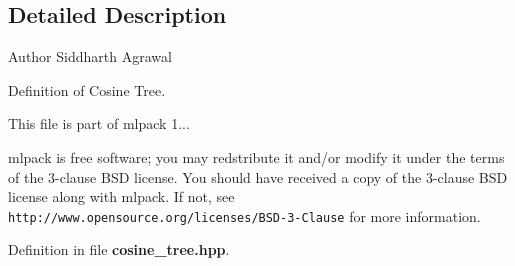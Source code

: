 \subsection{Detailed Description}
\begin{DoxyAuthor}{Author}
Siddharth Agrawal
\end{DoxyAuthor}
Definition of Cosine Tree.

This file is part of mlpack 1...

mlpack is free software; you may redstribute it and/or modify it under the terms of the 3-\/clause B\-S\-D license. You should have received a copy of the 3-\/clause B\-S\-D license along with mlpack. If not, see {\tt http\-://www.\-opensource.\-org/licenses/\-B\-S\-D-\/3-\/\-Clause} for more information. 

Definition in file {\bf cosine\-\_\-tree.\-hpp}.

